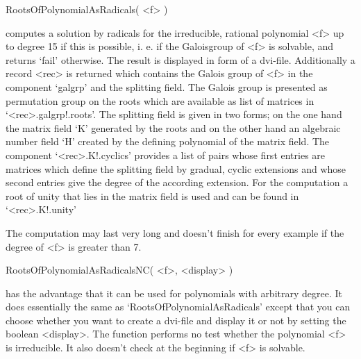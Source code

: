 \> RootsOfPolynomialAsRadicals( <f> )

computes a solution by radicals for the irreducible, rational polynomial <f>
up to degree 15 if this is possible, i. e. if the Galoisgroup of <f> is
solvable, and returns `fail' otherwise. The result is displayed in form of a
dvi-file. Additionally a record <rec> is returned which contains the Galois
group of <f> in the component `galgrp' and the splitting field. The Galois
group is presented as permutation group on the roots which are available as
list of matrices in `<rec>.galgrp!.roots'. The splitting field is given in two
forms; on the one hand the matrix field `K' generated by the roots and on the
other hand an algebraic number field `H' created by the defining polynomial of
the matrix field. The component `<rec>.K!.cyclics' provides a list of pairs
whose first entries are matrices which define the splitting field by gradual,
cyclic extensions and whose second entries give the degree of the according
extension. For the computation a root of unity that lies in the matrix field
is used and can be found in `<rec>.K!.unity'

The computation may last very long and doesn't finish for every example if the
degree of <f> is greater than 7.

\> RootsOfPolynomialAsRadicalsNC( <f>, <display> )

has the advantage that it can be used for polynomials with arbitrary
degree. It does essentially the same as `RootsOfPolynomialAsRadicals' except
that you can choose whether you want to create a dvi-file and display it or not
by setting the boolean <display>. The function performs no test whether the
polynomial <f> is irreducible. It also doesn't check at the beginning if <f> is
solvable.






